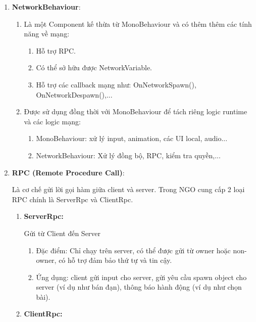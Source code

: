 \begin{enumerate}[$\bullet$]
\begin{enumerate}[-]
\begin{enumerate}[+]
        \end{enumerate}
    \end{enumerate}
    \item \textbf{NetworkBehaviour}:
    \begin{enumerate}[-]
        \item Là một Component kế thừa từ MonoBehaviour và có thêm thêm các tính năng về mạng:
        \begin{enumerate}[+]
            \item Hỗ trợ RPC.
            \item Có thể sở hữu được NetworkVariable.
            \item Hỗ trợ các callback mạng như: OnNetworkSpawn(), OnNetworkDespawn(),...
        \end{enumerate}
        \item Được sử dụng đồng thời với MonoBehaviour để tách riêng logic runtime và các logic mạng:
        \begin{enumerate}[+]
            \item MonoBehaviour: xử lý input, animation, các UI local, audio...
            \item NetworkBehaviour: Xử lý đồng bộ, RPC, kiểm tra quyền,...
        \end{enumerate}
    \end{enumerate}
    \item \textbf{RPC (Remote Procedure Call)}:

    Là cơ chế gửi lời gọi hàm giữa client và server. Trong NGO cung cấp 2 loại RPC chính là ServerRpc và ClientRpc.
    \begin{enumerate}[-]
        \item \textbf{ServerRpc:}

        Gửi từ Client đến Server
        \begin{enumerate}[+]
            \item Đặc điểm: Chỉ chạy trên server, có thể được gửi từ owner hoặc non-owner, có hỗ trợ đảm bảo thứ tự và tin cậy.
            \item Ứng dụng: client gửi input cho server, gửi yêu cầu spawn object cho server (ví dụ như bán đạn), thông báo hành động (ví dụ như chọn bài).
        \end{enumerate}
        \item \textbf{ClientRpc:}


\end{enumerate}
\end{enumerate}
